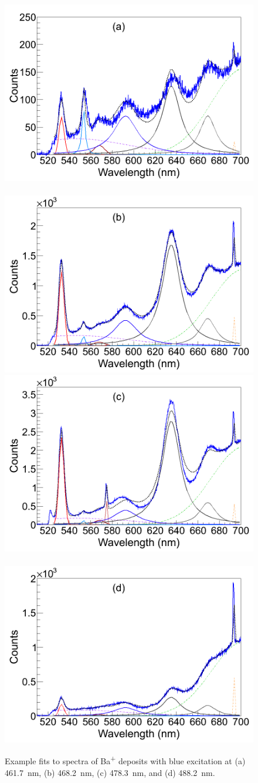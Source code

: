 \begin{figure} %
        \centering
                \includegraphics[width=.5\textwidth]{figures/spectra_blu_fit_a.png}
                ~
                \includegraphics[width=.5\textwidth]{figures/spectra_blu_fit_b.png}
                \includegraphics[width=.5\textwidth]{figures/spectra_blu_fit_c.png}
                ~
                \includegraphics[width=.5\textwidth]{figures/spectra_blu_fit_d.png}
                \caption{Example fits to spectra of Ba\textsuperscript{+} deposits with blue excitation at (a) 461.7~nm, (b) 468.2~nm, (c) 478.3~nm, and (d) 488.2~nm.}
\label{fig:specFitsBlu}
\end{figure}

